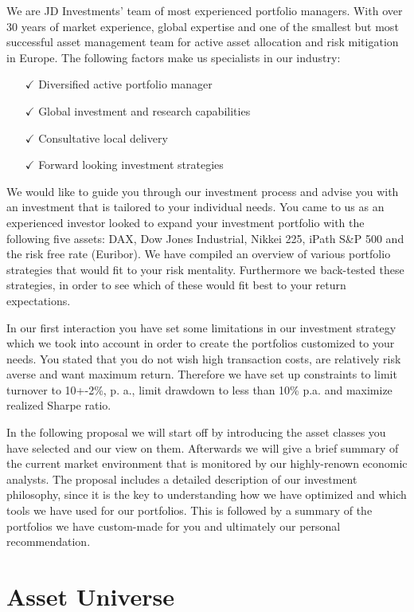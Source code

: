 \documentclass{scrreprt}
\begin{document}
We are JD Investments’ team of most experienced portfolio managers.
With over 30 years of market experience, global expertise and one of the smallest but most successful asset management team for active asset allocation and risk mitigation in Europe.
The following factors make us specialists in our industry: 

\begin{itemize}
\item[$\checkmark$] Diversified active portfolio manager
\item[$\checkmark$] Global investment and research capabilities 
\item[$\checkmark$] Consultative local delivery 
\item[$\checkmark$] Forward looking investment strategies 
\end{itemize}

We would like to guide you through our investment process and advise you with an investment that is tailored to your individual needs.
You came to us as an experienced investor looked to expand your investment portfolio with the following five assets: DAX, Dow Jones Industrial, Nikkei 225, iPath S\&P 500 and the risk free rate (Euribor).
We have compiled an overview of various portfolio strategies that would fit to your risk mentality.
Furthermore we back-tested these strategies, in order to see which of these would fit best to your return expectations.
  
In our first interaction you have set some limitations in our investment strategy which we took into account in order to create the portfolios customized to your needs.
You stated that you do not wish high transaction costs, are relatively risk averse and want maximum return.
Therefore we have set up constraints to limit turnover to 10+-2\%, p.
a., limit drawdown to less than 10\% p.a. and maximize realized Sharpe ratio.

In the following proposal we will start off by introducing the asset classes you have selected and our view on them.
Afterwards we will give a brief summary of the current market environment that is monitored by our highly-renown economic analysts.
The proposal includes a detailed description of our investment philosophy, since it is the key to understanding how we have optimized and which tools we have used for our portfolios.
This is followed by a summary of the portfolios we have custom-made for you and ultimately our personal recommendation.
 


\chapter{Asset Universe}
\end{document}
